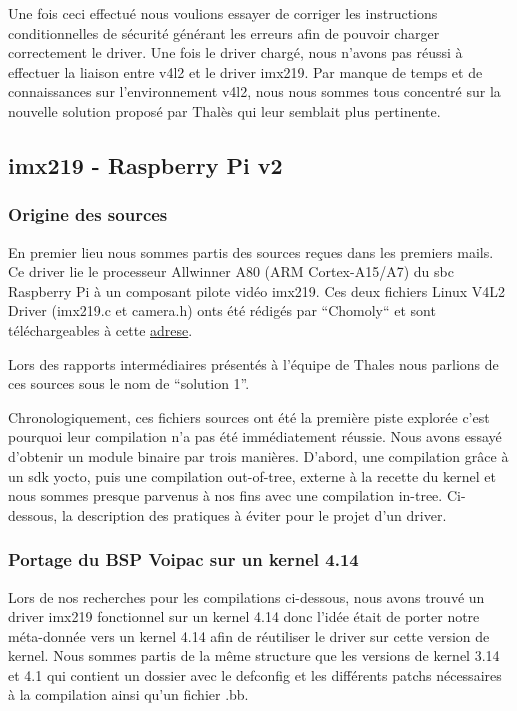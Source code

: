 {Une fois ceci effectué nous voulions essayer de corriger les instructions conditionnelles de
sécurité générant les erreurs afin de pouvoir charger correctement le driver. Une fois le
driver chargé, nous n’avons pas réussi à effectuer la liaison entre v4l2 et le driver imx219.
Par manque de temps et de connaissances sur l’environnement v4l2, nous nous sommes
tous concentré sur la nouvelle solution proposé par Thalès qui leur semblait plus
pertinente.

\subsection{imx219 - Raspberry Pi v2}

\subsubsection{Origine des sources}
En premier lieu nous sommes partis des sources reçues dans les premiers
mails. Ce driver lie le processeur Allwinner A80 (ARM Cortex-A15/A7) du sbc Raspberry Pi à un
composant pilote vidéo imx219. Ces deux fichiers Linux V4L2 Driver (imx219.c et
camera.h) onts été rédigés par “Chomoly“ et sont téléchargeables à cette 
\href{https://www.raspberrypi.org/forums/viewtopic.php?f=43&t=162722}{adrese}. \medskip

Lors des rapports intermédiaires présentés à l’équipe de Thales nous parlions de ces
sources sous le nom de “solution 1”. \medskip

Chronologiquement, ces fichiers sources ont été la première piste explorée c’est pourquoi
leur compilation n’a pas été immédiatement réussie. Nous avons essayé d’obtenir un
module binaire par trois manières. D’abord, une compilation grâce à un sdk yocto, puis
une compilation out-of-tree, externe à la recette du kernel et nous sommes presque
parvenus à nos fins avec une compilation in-tree. Ci-dessous, la description des pratiques
à éviter pour le projet d’un driver.

\subsubsection{Portage du BSP Voipac sur un kernel 4.14}

Lors de nos recherches pour les compilations ci-dessous, nous avons trouvé un driver
imx219 fonctionnel sur un kernel 4.14 donc l’idée était de porter notre méta-donnée vers
un kernel 4.14 afin de réutiliser le driver sur cette version de kernel.
Nous sommes partis de la même structure que les versions de kernel 3.14 et 4.1 qui
contient un dossier avec le defconfig et les différents patchs nécessaires à la compilation
ainsi qu’un fichier .bb.

}

